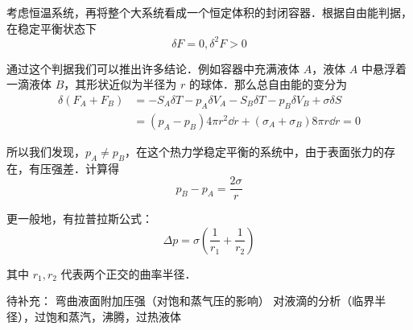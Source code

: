 考虑恒温系统，再将整个大系统看成一个恒定体积的封闭容器．根据自由能判据，在稳定平衡状态下
\begin{equation}
\delta F=0,\delta^2 F>0
\end{equation}

通过这个判据我们可以推出许多结论．例如容器中充满液体 $A$，液体 $A$ 中悬浮着一滴液体 $B$，其形状近似为半径为 $r$ 的球体．那么总自由能的变分为
\begin{align}
\delta(F_A+F_B)&=-S_A\delta T-p_A\delta V_A-S_B\delta T-p_B\delta V_B+\sigma\delta S\\
&=(p_A-p_B)4\pi r^2\dd r + (\sigma_A+\sigma_B)8\pi r\dd r=0
\end{align}

所以我们发现，$p_A\neq p_B$，在这个热力学稳定平衡的系统中，由于表面张力的存在，有压强差．计算得
\begin{equation}
p_B-p_A=\frac{2\sigma}{r}
\end{equation}

更一般地，有拉普拉斯公式：
\begin{equation}\label{sftens_eq1}
\Delta p = \sigma \left(\frac{1}{r_1}+\frac{1}{r_2}\right)
\end{equation}

其中 $r_1,r_2$ 代表两个正交的曲率半径．

待补充：
弯曲液面附加压强（对饱和蒸气压的影响）
对液滴的分析（临界半径），过饱和蒸汽，沸腾，过热液体